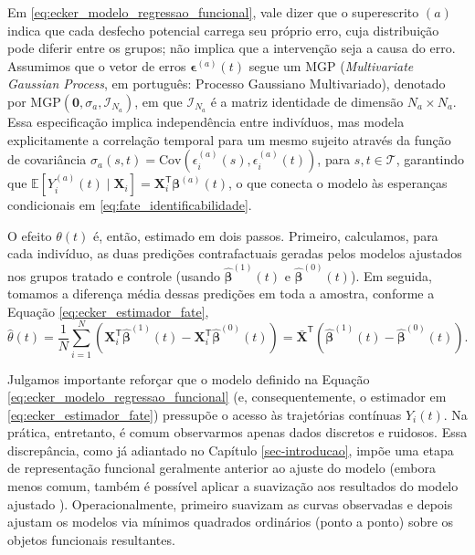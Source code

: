 Em \ref{eq:ecker_modelo_regressao_funcional}, vale dizer que o superescrito \((a)\) indica que cada desfecho potencial carrega seu próprio erro, cuja distribuição pode diferir entre os grupos; não implica que a intervenção seja a causa do erro. 
Assumimos que o vetor de erros \(\boldsymbol{\epsilon}^{(a)}(t)\) segue um MGP (\emph{Multivariate Gaussian Process}, em português: Processo Gaussiano Multivariado), denotado por \(\mathrm{MGP}(\mathbf{0}, \sigma_a, \mathcal{I}_{N_a})\), em que \(\mathcal{I}_{N_a}\) é a matriz identidade de dimensão \(N_a \times N_a\). 
Essa especificação implica independência entre indivíduos, mas modela explicitamente a correlação temporal para um mesmo sujeito através da função de covariância \(\sigma_a(s,t) = \mathrm{Cov}\left(\epsilon_i^{(a)}(s), \epsilon_i^{(a)}(t)\right)\), para \(s, t \in \mathcal{T}\), garantindo que \(\mathbb{E}[Y_i^{(a)}(t) \mid \mathbf{X}_i] = \mathbf{X}_i^{\mathsf{T}}\boldsymbol{\beta}^{(a)}(t)\), o que conecta o modelo às esperanças condicionais em \eqref{eq:fate_identificabilidade}.

O efeito \(\theta(t)\) é, então, estimado em dois passos. Primeiro, calculamos, para cada indivíduo, as duas predições contrafactuais geradas pelos modelos ajustados nos grupos tratado e controle (usando \(\hat{\boldsymbol{\beta}}^{(1)}(t)\) e \(\hat{\boldsymbol{\beta}}^{(0)}(t)\)). 
Em seguida, tomamos a diferença média dessas predições em toda a amostra, conforme a Equação \ref{eq:ecker_estimador_fate},
\begin{equation}
    \hat{\theta}(t) = \frac{1}{N}\sum\limits_{i = 1}^{N}\left(\mathbf{X}_i^{\mathsf{T}}\hat{\boldsymbol{\beta}}^{(1)}(t) - \mathbf{X}_i^{\mathsf{T}}\hat{\boldsymbol{\beta}}^{(0)}(t)\right) = \bar{\mathbf{X}}^{\mathsf{T}}\left(\hat{\boldsymbol{\beta}}^{(1)}(t) - \hat{\boldsymbol{\beta}}^{(0)}(t)\right).
    \label{eq:ecker_estimador_fate}
\end{equation}

Julgamos importante reforçar que o modelo definido na Equação \ref{eq:ecker_modelo_regressao_funcional} (e, consequentemente, o estimador em \ref{eq:ecker_estimador_fate}) pressupõe o acesso às trajetórias contínuas \(Y_i(t)\). 
Na prática, entretanto, é comum observarmos apenas dados discretos e ruidosos. Essa discrepância, como já adiantado no Capítulo \ref{sec-introducao}, impõe uma etapa de representação funcional geralmente anterior ao ajuste do modelo (embora menos comum, também é possível aplicar a suavização aos resultados do modelo ajustado \cite{testa_doubly-robust_2025}). 
Operacionalmente,  primeiro suavizam as curvas observadas e depois ajustam os modelos via mínimos quadrados ordinários (ponto a ponto) sobre os objetos funcionais resultantes.


